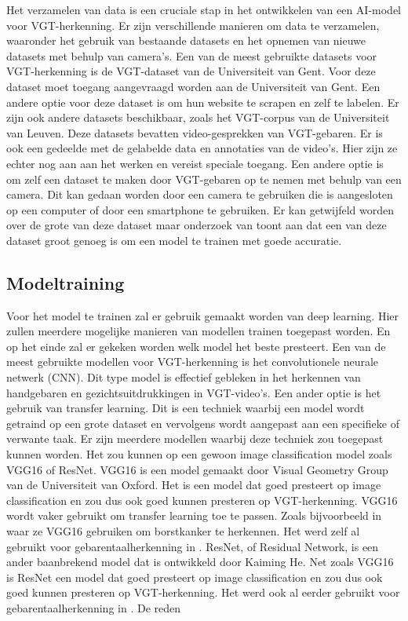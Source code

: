 Het verzamelen van data is een cruciale stap in het ontwikkelen van een AI-model voor VGT-herkenning.
Er zijn verschillende manieren om data te verzamelen, waaronder het gebruik van bestaande datasets en het opnemen van nieuwe datasets met behulp van camera's.
Een van de meest gebruikte datasets voor VGT-herkenning is de VGT-dataset van de Universiteit van Gent.\autocite{VGT_Signbank}
Voor deze dataset moet toegang aangevraagd worden aan de Universiteit van Gent.
Een andere optie voor deze dataset is om hun website te scrapen en zelf te labelen.
Er zijn ook andere datasets beschikbaar, zoals het VGT-corpus van de Universiteit van Leuven.\textcite{Corpus_VGT}
Deze datasets bevatten video-gesprekken van VGT-gebaren.
Er is ook een gedeelde met de gelabelde data en annotaties van de video's.
Hier zijn ze echter nog aan aan het werken en vereist speciale toegang.\autocite{Over_het_Corpus_VGT}
Een andere optie is om zelf een dataset te maken door VGT-gebaren op te nemen met behulp van een camera.
Dit kan gedaan worden door een camera te gebruiken die is aangesloten op een computer of door een smartphone te gebruiken.
Er kan getwijfeld worden over de grote van deze dataset maar onderzoek van \textcite{Coster2023} toont aan dat een van deze dataset groot genoeg is om een model te trainen met goede accuratie.

\subsection{Modeltraining}
\label{subsec:modeltraining}
Voor het model te trainen zal er gebruik gemaakt worden van deep learning.
Hier zullen meerdere mogelijke manieren van modellen trainen toegepast worden. 
En op het einde zal er gekeken worden welk model het beste presteert.
Een van de meest gebruikte modellen voor VGT-herkenning is het convolutionele neurale netwerk (CNN).
Dit type model is effectief gebleken in het herkennen van handgebaren en gezichtsuitdrukkingen in VGT-video's.\autocite{10.17485/ijst/v16i45.2583}
Een ander optie is het gebruik van transfer learning.
Dit is een techniek waarbij een model wordt getraind op een grote dataset en vervolgens wordt aangepast aan een specifieke of verwante taak.\autocite{torrey2010transfer}
Er zijn meerdere modellen waarbij deze techniek zou toegepast kunnen worden.
Het zou kunnen op een gewoon image classification model zoals VGG16 of ResNet.
VGG16 is een model gemaakt door Visual Geometry Group van de Universiteit van Oxford.
Het is een model dat goed presteert op image classification en zou dus ook goed kunnen presteren op VGT-herkenning.
VGG16 wordt vaker gebruikt om transfer learning toe te passen.
Zoals bijvoorbeeld in \textcite{9491631} waar ze VGG16 gebruiken om borstkanker te herkennen.
Het werd zelf al gebruikt voor gebarentaalherkenning in \textcite{Abu-Jamie2022-ABUCOS-2}.
ResNet, of Residual Network, is een ander baanbrekend model dat is ontwikkeld door Kaiming He.
Net zoals VGG16 is ResNet een model dat goed presteert op image classification en zou dus ook goed kunnen presteren op VGT-herkenning.
Het werd ook al eerder gebruikt voor gebarentaalherkenning in \textcite{Wang2022}.
De reden 

